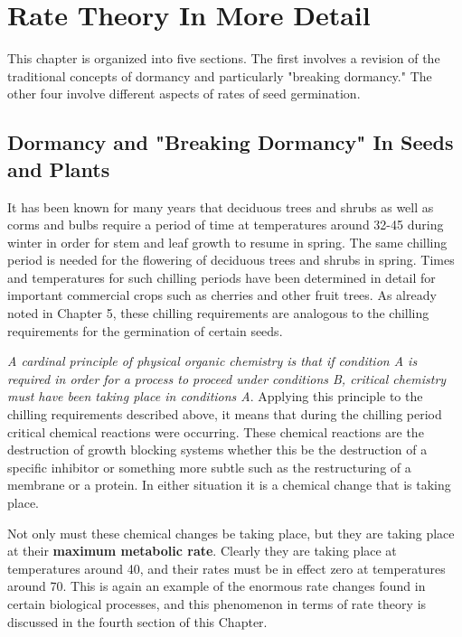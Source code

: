 \chapter{Rate Theory In More Detail}

This chapter is organized into five sections. The first involves a revision of the
traditional concepts of dormancy and particularly "breaking dormancy." The other four
involve different aspects of rates of seed germination.

\section[Breaking Dormancy]{Dormancy and "Breaking Dormancy" In Seeds and Plants}

It has been known for many years that deciduous trees and shrubs as well as
corms and bulbs require a period of time at temperatures around 32-45 during winter
in order for stem and leaf growth to resume in spring. The same chilling period is
needed for the flowering of deciduous trees and shrubs in spring. Times and
temperatures for such chilling periods have been determined in detail for important
commercial crops such as cherries and other fruit trees. As already noted in Chapter
5, these chilling requirements are analogous to the chilling requirements for the
germination of certain seeds.

\textit{A cardinal principle of physical organic chemistry is that if condition A is
required in order for a process to proceed under conditions B, critical chemistry must
have been taking place in conditions A}. Applying this principle to the chilling
requirements described above, it means that during the chilling period critical
chemical reactions were occurring. These chemical reactions are the destruction of
growth blocking systems whether this be the destruction of a specific inhibitor or
something more subtle such as the restructuring of a membrane or a protein. In either
situation it is a chemical change that is taking place.

Not only must these chemical changes be taking place, but they are taking
place at their \textbf{maximum metabolic rate}. Clearly they are taking place at
temperatures around 40, and their rates must be in effect zero at temperatures around
70. This is again an example of the enormous rate changes found in certain biological
processes, and this phenomenon in terms of rate theory is discussed in the fourth
section of this Chapter.

